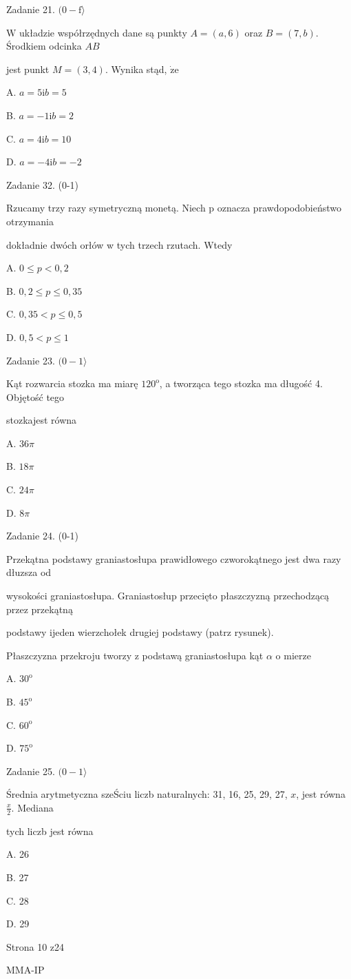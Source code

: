\documentclass[a4paper,12pt]{article}
\begin{document}
Zadanie 21. $(0-\mathrm{f}\rangle$

$\mathrm{W}$ układzie współrzędnych dane są punkty $A=(a,6)$ oraz $B=(7,b)$. Środkiem odcinka $AB$

jest punkt $M=(3,4)$. Wynika stąd, $\dot{\mathrm{z}}\mathrm{e}$

A. $a=5 \mathrm{i}b=5$

B. $a=-1 \mathrm{i}b=2$

C. $a=4\mathrm{i}b=10$

D. $a=-4 \mathrm{i}b=-2$

Zadanie 32. (0-1)

Rzucamy trzy razy symetryczną monetą. Niech p oznacza prawdopodobieństwo otrzymania

dokładnie dwóch orłów w tych trzech rzutach. Wtedy

A. $0\leq p<0,2$

B. $0,2\leq p\leq 0,35$

C. $0,35<p\leq 0,5$

D. $0,5<p\leq 1$

Zadanie 23. $(0-1\rangle$

Kąt rozwarcia stozka ma miarę $120^{\mathrm{o}}$, a tworząca tego stozka ma długość 4. Objętość tego

stozkajest równa

A. $ 36\pi$

B. $ 18\pi$

C. $ 24\pi$

D. $ 8\pi$

Zadanie 24. (0-1)

Przekątna podstawy graniastosłupa prawidłowego czworokątnego jest dwa razy dłuzsza od

wysokości graniastosłupa. Graniastosłup przecięto płaszczyzną przechodzącą przez przekątną

podstawy ijeden wierzchołek drugiej podstawy (patrz rysunek).

Płaszczyzna przekroju tworzy z podstawą graniastosłupa kąt $\alpha$ o mierze

A. $30^{\mathrm{o}}$

B. $45^{\mathrm{o}}$

C. $60^{\mathrm{o}}$

D. $75^{\mathrm{o}}$

Zadanie 25. $(0-1\rangle$

Średnia arytmetyczna szeŚciu liczb naturalnych: 31, 16, 25, 29, 27, $x$, jest równa $\displaystyle \frac{x}{2}$. Mediana

tych liczb jest równa

A. 26

B. 27

C. 28

D. 29

Strona 10 z24

MMA-IP
\end{document}
